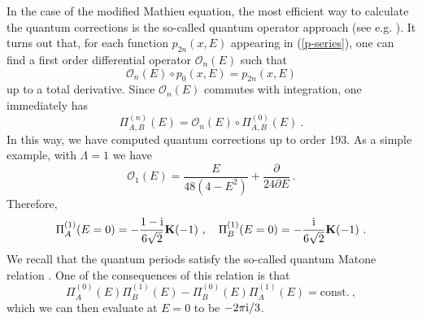 \documentclass[a4paper,11pt]{article}
\theoremstyle{definition}
\newcommand{\ri}{{\rm i}}
\newcommand{\myg}{\color [rgb]{0.8,0,0.8}}
\newcommand{\be}{\begin{equation}}
\newcommand{\ee}{\end{equation}}
\newcommand{\ba}{\begin{aligned}}
\newcommand{\ea}{\end{aligned}}
\def\mc{\mathcal}
\def\md{\mathbf}
\newcommand{\pd}{\partial}
\begin{document}
In the case of the modified Mathieu equation, the most efficient way
to calculate the quantum corrections is the so-called quantum operator
approach (see e.g. \cite{huangNS}). It turns out that, for each
function $p_{2n}(x, E)$ appearing in (\ref{p-series}), one can find a
first order differential operator $\mc O_n(E)$ such that
%
\begin{equation}
  \mc O_n(E)\circ p_0(x,E) = p_{2n}(x,E)
\end{equation}
%
up to a total derivative.
Since $\mc O_n(E)$ commutes with integration, one immediately has
%
\begin{equation}
  \Pi_{A,B}^{(n)}(E) = \mc O_n(E)\circ \Pi_{A,B}^{(0)}(E) \ .
\end{equation}
%
In this way, we have computed quantum corrections up to order 193.  As
a simple example, with $\Lambda=1$ we have \cite{huangNS}
%
\begin{equation}
  \mc O_1 (E) = \frac{E}{48(4-E^2)} + \frac{\pd}{24\pd E} \ .
\end{equation}
%
Therefore, 
%
\begin{equation}
  \Pi_A^{(1)}(E=0) = -\frac{1-\ri}{6\sqrt{2}}\md K(-1)\ ,\quad
  \Pi_B^{(1)}(E=0) = -\frac{\ri}{6\sqrt{2}}\md K(-1) \ .
\end{equation}
%
We recall that the quantum periods satisfy the so-called quantum
Matone relation
\cite{matone,francisco,basar-dunne,bdu-quantum,gorsky,coms}. One of
the consequences of this relation is that
%
\begin{equation}\label{eq:qMatone}
  \Pi^{(0)}_A(E) \Pi^{(1)}_B(E) - \Pi^{(0)}_B(E) \Pi^{(1)}_A(E) =
  \text{const.} \ , 
\end{equation}
which we can then evaluate at $E=0$ to be
$-2 \pi \ri /3$. 


\end{document}
